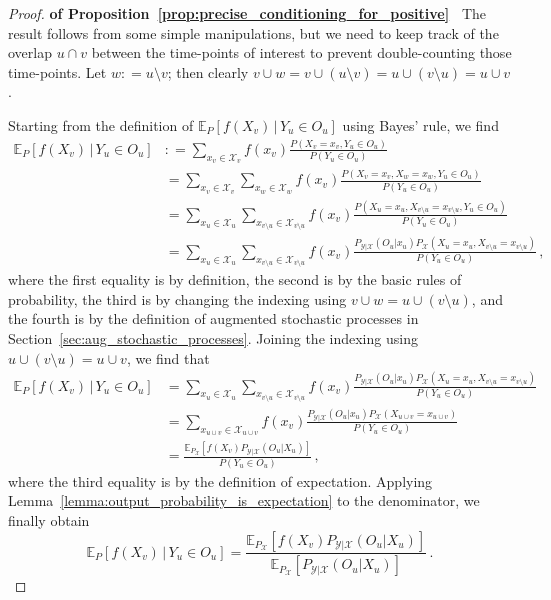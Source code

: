 \documentclass[twoside,11pt]{article}
\newcommand{\states}{\mathcal{X}}
\newcommand{\observs}{\mathcal{Y}}
\newcommand{\coloneqq}{:\!=}
\begin{document}
\begin{proof}{\bf of Proposition~\ref{prop:precise_conditioning_for_positive}~}
The result follows from some simple manipulations, but we need to keep track of the overlap $u\cap v$ between the time-points of interest to prevent double-counting those time-points. Let $w\coloneqq u\setminus v$; then clearly $v\cup w = v\cup (u\setminus v) = u\cup (v\setminus u)=u\cup v$.

Starting from the definition of $\mathbb{E}_P[f(X_v)\,\vert\,Y_u\in O_u]$ using Bayes' rule, we find
\begin{align*}
\mathbb{E}_P[f(X_v)\,\vert\,Y_u\in O_u] &\coloneqq \sum_{x_v\in\states_v} f(x_v)\frac{P(X_v=x_v, Y_u\in O_u)}{P(Y_u\in O_u)} \\
&= \sum_{x_v\in\states_v} \sum_{x_w\in\states_w} f(x_v)\frac{P(X_v=x_v, X_w=x_w, Y_u\in O_u)}{P(Y_u\in O_u)} \\
&= \sum_{x_u\in\states_u}\sum_{x_{v\setminus u}\in\states_{v\setminus u}} f(x_v)\frac{P(X_u=x_u, X_{v\setminus u}=x_{v\setminus u}, Y_u\in O_u)}{P(Y_u\in O_u)} \\
&= \sum_{x_u\in\states_u}\sum_{x_{v\setminus u}\in\states_{v\setminus u}} f(x_v)\frac{P_{\observs\vert\states}(O_u\vert x_u)P_\states(X_u=x_u, X_{v\setminus u}=x_{v\setminus u})}{P(Y_u\in O_u)}\,,
\end{align*}
where the first equality is by definition, the second is by the basic rules of probability, the third is by changing the indexing using $v\cup w=u\cup(v\setminus u)$, and the fourth is by the definition of augmented stochastic processes in Section~\ref{sec:aug_stochastic_processes}. Joining the indexing using $u\cup(v\setminus u)=u\cup v$, we find that
\begin{align*}
\mathbb{E}_P[f(X_v)\,\vert\,Y_u\in O_u] &= \sum_{x_u\in\states_u}\sum_{x_{v\setminus u}\in\states_{v\setminus u}} f(x_v)\frac{P_{\observs\vert\states}(O_u\vert x_u)P_\states(X_u=x_u, X_{v\setminus u}=x_{v\setminus u})}{P(Y_u\in O_u)} \\
 &= \sum_{x_{u\cup v}\in\states_{u\cup v}} f(x_v)\frac{P_{\observs\vert\states}(O_u\vert x_u)P_\states(X_{u\cup v}=x_{u\cup v})}{P(Y_u\in O_u)} \\
 &= \frac{\mathbb{E}_{P_\states}[f(X_v)P_{\observs\vert\states}(O_u\vert X_u)]}{P(Y_u\in O_u)}\,,
\end{align*}
where the third equality is by the definition of expectation. Applying Lemma~\ref{lemma:output_probability_is_expectation} to the denominator, we finally obtain
\begin{equation*}
\mathbb{E}_P[f(X_v)\,\vert\,Y_u\in O_u] = \frac{\mathbb{E}_{P_\states}[f(X_v)P_{\observs\vert\states}(O_u\vert X_u)]}{\mathbb{E}_{P_\states}[P_{\observs\vert\states}(O_u\vert X_u)]}\,.
\end{equation*}
\end{proof}
\end{document}
